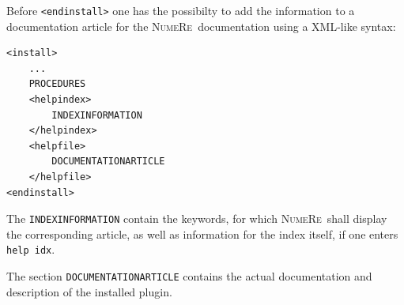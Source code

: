 \documentclass[DIV=14,headsepline,footsepline]{scrbook}
\newcommand{\NR}{\textsc{Nu\-me\-Re}}
\begin{document}
				Before \verb+<endinstall>+ one has the possibilty to add the information to a documentation article for the \NR\ documentation using a XML-like syntax:
				\begin{lstlisting}
<install>
	...
	PROCEDURES
	<helpindex>
		INDEXINFORMATION
	</helpindex>
	<helpfile>
		DOCUMENTATIONARTICLE
	</helpfile>
<endinstall>
				\end{lstlisting}
				The \verb+INDEXINFORMATION+ contain the keywords, for which \NR\ shall display the corresponding article, as well as information for the index itself, if one enters \verb+help idx+.
				
				The section \verb+DOCUMENTATIONARTICLE+ contains the actual documentation and description of the installed plugin.
				
\end{document}

